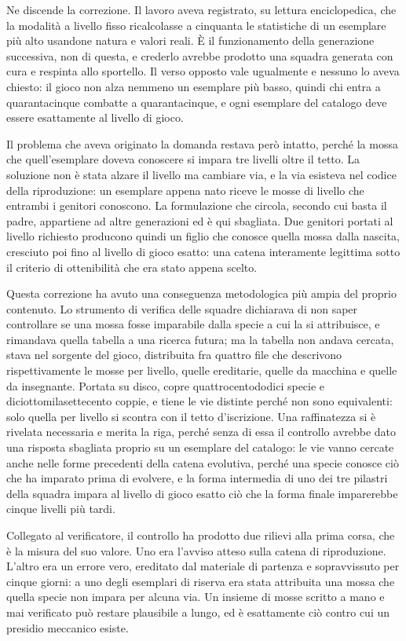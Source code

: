 Ne discende la correzione. Il lavoro aveva registrato, su lettura enciclopedica, che la modalità a livello fisso ricalcolasse a cinquanta le statistiche di un esemplare più alto usandone natura e valori reali. È il funzionamento della generazione successiva, non di questa, e crederlo avrebbe prodotto una squadra generata con cura e respinta allo sportello. Il verso opposto vale ugualmente e nessuno lo aveva chiesto: il gioco non alza nemmeno un esemplare più basso, quindi chi entra a quarantacinque combatte a quarantacinque, e ogni esemplare del catalogo deve essere esattamente al livello di gioco.

Il problema che aveva originato la domanda restava però intatto, perché la mossa che quell'esemplare doveva conoscere si impara tre livelli oltre il tetto. La soluzione non è stata alzare il livello ma cambiare via, e la via esisteva nel codice della riproduzione: un esemplare appena nato riceve le mosse di livello che entrambi i genitori conoscono. La formulazione che circola, secondo cui basta il padre, appartiene ad altre generazioni ed è qui sbagliata. Due genitori portati al livello richiesto producono quindi un figlio che conosce quella mossa dalla nascita, cresciuto poi fino al livello di gioco esatto: una catena interamente legittima sotto il criterio di ottenibilità che era stato appena scelto.

Questa correzione ha avuto una conseguenza metodologica più ampia del proprio contenuto. Lo strumento di verifica delle squadre dichiarava di non saper controllare se una mossa fosse imparabile dalla specie a cui la si attribuisce, e rimandava quella tabella a una ricerca futura; ma la tabella non andava cercata, stava nel sorgente del gioco, distribuita fra quattro file che descrivono rispettivamente le mosse per livello, quelle ereditarie, quelle da macchina e quelle da insegnante. Portata su disco, copre quattrocentododici specie e diciottomilasettecento coppie, e tiene le vie distinte perché non sono equivalenti: solo quella per livello si scontra con il tetto d'iscrizione. Una raffinatezza si è rivelata necessaria e merita la riga, perché senza di essa il controllo avrebbe dato una risposta sbagliata proprio su un esemplare del catalogo: le vie vanno cercate anche nelle forme precedenti della catena evolutiva, perché una specie conosce ciò che ha imparato prima di evolvere, e la forma intermedia di uno dei tre pilastri della squadra impara al livello di gioco esatto ciò che la forma finale imparerebbe cinque livelli più tardi.

Collegato al verificatore, il controllo ha prodotto due rilievi alla prima corsa, che è la misura del suo valore. Uno era l'avviso atteso sulla catena di riproduzione. L'altro era un errore vero, ereditato dal materiale di partenza e sopravvissuto per cinque giorni: a uno degli esemplari di riserva era stata attribuita una mossa che quella specie non impara per alcuna via. Un insieme di mosse scritto a mano e mai verificato può restare plausibile a lungo, ed è esattamente ciò contro cui un presidio meccanico esiste.

